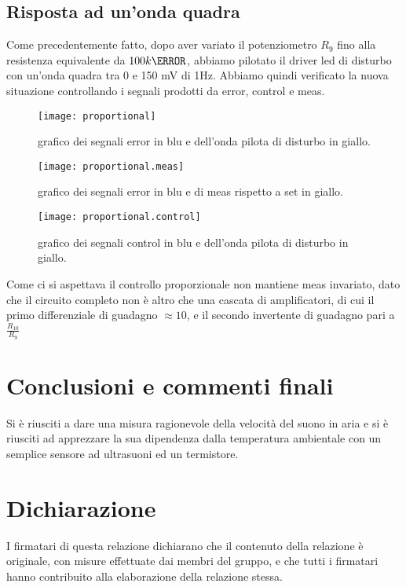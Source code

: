 \documentclass[10pt, a4paper, italian]{article}
\begin{document}
\subsection{Risposta ad un'onda quadra}
Come precedentemente fatto, dopo aver variato il potenziometro $R_9$ fino alla resistenza equivalente da $100 k\ohm$, abbiamo pilotato il driver led di disturbo con un'onda quadra tra 0 e 150 mV di 1Hz. Abbiamo quindi verificato la nuova situazione controllando i segnali prodotti da error, control e meas.
\begin{figure}[H]
    \centering
	\texttt{[image: proportional]}
    \caption{grafico dei segnali error in blu e dell'onda pilota di disturbo in giallo.
    \label{fig: Draft1}}
\end{figure}
\begin{figure}[H]
    \centering
	\texttt{[image: proportional.meas]}
    \caption{grafico dei segnali error in blu e di meas rispetto a set in giallo.
    \label{fig: Draft1}}
\end{figure}
\begin{figure}[H]
    \centering
	\texttt{[image: proportional.control]}
    \caption{grafico dei segnali control in blu e dell'onda pilota di disturbo in giallo.
    \label{fig: Draft1}}
\end{figure}
Come ci si aspettava il controllo proporzionale non mantiene meas invariato, dato che il circuito completo non è altro che una cascata di amplificatori, di cui il primo differenziale di guadagno $\approx 10$, e il secondo invertente di guadagno pari a $\frac{R_{10}}{R_9}$
\fi
\section*{Conclusioni e commenti finali}
Si è riusciti a dare una misura ragionevole della velocità del suono in aria
e si è riusciti ad apprezzare la sua dipendenza dalla temperatura ambientale
con un semplice sensore ad ultrasuoni ed un termistore.

\section*{Dichiarazione}
I firmatari di questa relazione dichiarano che il contenuto della relazione \`e
originale, con misure effettuate dai membri del gruppo, e che tutti i firmatari
hanno contribuito alla elaborazione della relazione stessa.
\end{document}
